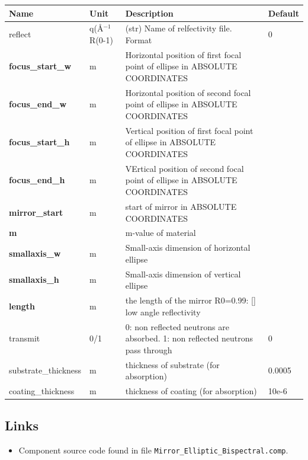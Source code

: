 \begin{longtable}{p{}p{}p{}p{}}
\toprule
\textbf{Name} & \textbf{Unit} & \textbf{Description} & \textbf{Default} \\
\midrule
\endhead
reflect & q(\AA{}$^{-1}$ R(0-1) & (str)  Name of relfectivity file. Format & 0 \\
\textbf{focus\_start\_w} & m & Horizontal position of first focal point of ellipse in ABSOLUTE COORDINATES &  \\
\textbf{focus\_end\_w} & m & Horizontal position of second focal point of ellipse in ABSOLUTE COORDINATES &  \\
\textbf{focus\_start\_h} & m & Vertical position of first focal point of ellipse in ABSOLUTE COORDINATES &  \\
\textbf{focus\_end\_h} & m & VErtical position of second focal point of ellipse in ABSOLUTE COORDINATES &  \\
\textbf{mirror\_start} & m & start of mirror in ABSOLUTE COORDINATES &  \\
\textbf{m} &  & m-value of material &  \\
\textbf{smallaxis\_w} & m & Small-axis dimension of horizontal ellipse &  \\
\textbf{smallaxis\_h} & m & Small-axis dimension of vertical ellipse &  \\
\textbf{length} & m & the length of the mirror R0=0.99:		[]	low angle reflectivity &  \\
transmit & 0/1 & 0: non reflected neutrons are absorbed. 1: non reflected neutrons pass through & 0 \\
substrate\_thickness & m & thickness of substrate (for absorption) & 0.0005 \\
coating\_thickness & m & thickness of coating (for absorption) & 10e-6 \\
\bottomrule
\end{longtable}

\subsection*{Links}
\begin{itemize}
  \item Component source code found in file \texttt{Mirror\_Elliptic\_Bispectral.comp}.
\end{itemize}
